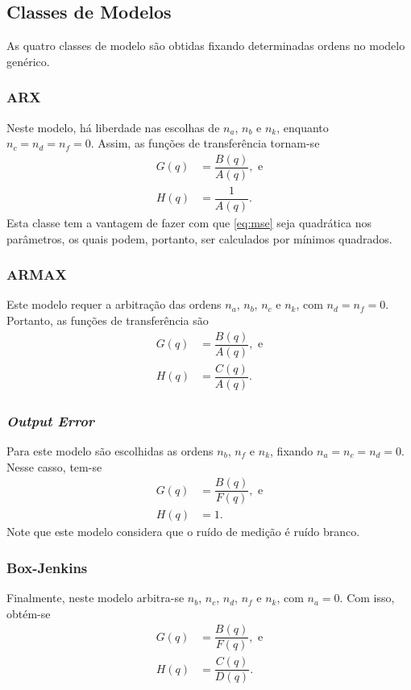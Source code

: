 \documentclass{ppgeesa}
\begin{document}
\subsection{Classes de Modelos}
As quatro classes de modelo são obtidas fixando determinadas ordens no modelo genérico.

\subsubsection{ARX}
Neste modelo, há liberdade nas escolhas de $n_a$, $n_b$ e $n_k$, enquanto $n_c = n_d = n_f = 0$.
Assim, as funções de transferência tornam-se
\begin{align}
  G(q) &= \dfrac{B(q)}{A(q)}
  , \text{ e}
  \\
  H(q) &= \dfrac{1}{A(q)}
  .
\end{align}
Esta classe tem a vantagem de fazer com que \eqref{eq:mse} seja quadrática nos parâmetros, os quais podem, portanto, ser calculados por mínimos quadrados.

\subsubsection{ARMAX}
Este modelo requer a arbitração das ordens $n_a$, $n_b$, $n_c$ e $n_k$, com $n_d = n_f = 0$.
Portanto, as funções de transferência são
\begin{align}
  G(q) &= \dfrac{B(q)}{A(q)}
  , \text{ e}
  \\
  H(q) &= \dfrac{C(q)}{A(q)}
  .
\end{align}

\subsubsection{\emph{Output Error}}
Para este modelo são escolhidas as ordens $n_b$, $n_f$ e $n_k$, fixando $n_a = n_c = n_d = 0$.
Nesse casso, tem-se
\begin{align}
  G(q) &= \dfrac{B(q)}{F(q)}
  , \text{ e}
  \\
  H(q) &= 1
  .
\end{align}
Note que este modelo considera que o ruído de medição é ruído branco. %

\subsubsection{Box-Jenkins}
Finalmente, neste modelo arbitra-se $n_b$, $n_c$, $n_d$, $n_f$ e $n_k$, com $n_a = 0$.
Com isso, obtém-se
\begin{align}
  G(q) &= \dfrac{B(q)}{F(q)}
  , \text{ e}
  \\
  H(q) &= \dfrac{C(q)}{D(q)}
  .
\end{align}
\end{document}
